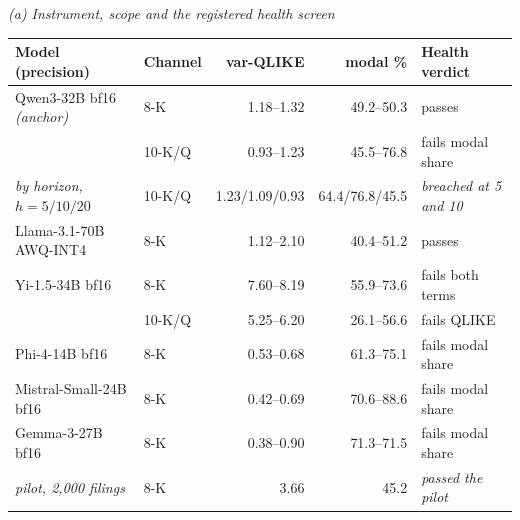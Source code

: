 \begin{table}[htbp]
\emph{(a) Instrument, scope and the registered health screen}\\[0.4ex]
\begin{tabular}{@{}llrrl@{}}
\toprule
Model (precision) & Channel & var-QLIKE & modal \% & Health verdict \\
\midrule
Qwen3-32B bf16 \emph{(anchor)} & 8-K    & 1.18--1.32 & 49.2--50.3 & passes \\
                               & 10-K/Q & 0.93--1.23 & 45.5--76.8 & fails modal share \\
\quad \emph{by horizon, $h=5/10/20$} & 10-K/Q & 1.23/1.09/0.93 & 64.4/76.8/45.5 & \emph{breached at 5 and 10} \\ %
Llama-3.1-70B AWQ-INT4         & 8-K    & 1.12--2.10 & 40.4--51.2 & passes \\
Yi-1.5-34B bf16                & 8-K    & 7.60--8.19 & 55.9--73.6 & fails both terms \\
                               & 10-K/Q & 5.25--6.20 & 26.1--56.6 & fails QLIKE \\
Phi-4-14B bf16                 & 8-K    & 0.53--0.68 & 61.3--75.1 & fails modal share \\
Mistral-Small-24B bf16         & 8-K    & 0.42--0.69 & 70.6--88.6 & fails modal share \\
Gemma-3-27B bf16               & 8-K    & 0.38--0.90 & 71.3--71.5 & fails modal share \\
\quad \emph{pilot, 2{,}000 filings} & 8-K & 3.66 & 45.2 & \emph{passed the pilot} \\
\bottomrule
\end{tabular}


\end{table}
